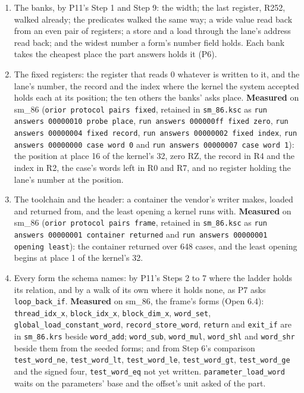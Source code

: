 \begin{enumerate}
\begin{enumerate}
\item The banks, by P11's Step 1 and Step 9: the width; the last register, R252, walked already; the predicates walked the same way; a wide value read back from an even pair of registers; a store and a load through the lane's address read back; and the widest number a form's number field holds. Each bank takes the cheapest place the part answers holds it (P6).
\item The fixed registers: the register that reads 0 whatever is written to it, and the lane's number, the record and the index where the kernel the system accepted holds each at its position; the ten others the banks' asks place. \textbf{Measured} on sm\_\allowbreak{}86 (\texttt{orior protocol pairs fixed}, retained in \texttt{sm\_\allowbreak{}86.\allowbreak{}ksc} as \texttt{run answers 00000010 probe place}, \texttt{run answers 000000ff fixed zero}, \texttt{run answers 00000004 fixed record}, \texttt{run answers 00000002 fixed index}, \texttt{run answers 00000000 case word 0} and \texttt{run answers 00000007 case word 1}): the position at place 16 of the kernel's 32, zero RZ, the record in R4 and the index in R2, the case's words left in R0 and R7, and no register holding the lane's number at the position.
\item The toolchain and the header: a container the vendor's writer makes, loaded and returned from, and the least opening a kernel runs with. \textbf{Measured} on sm\_\allowbreak{}86 (\texttt{orior protocol pairs frame}, retained in \texttt{sm\_\allowbreak{}86.\allowbreak{}ksc} as \texttt{run answers 00000001 container returned} and \texttt{run answers 00000001 opening least}): the container returned over 648 cases, and the least opening begins at place 1 of the kernel's 32.
\item Every form the schema names: by P11's Steps 2 to 7 where the ladder holds its relation, and by a walk of its own where it holds none, as P7 asks \texttt{loop\_\allowbreak{}back\_\allowbreak{}if}. \textbf{Measured} on sm\_\allowbreak{}86, the frame's forms (Open 6.4): \texttt{thread\_\allowbreak{}idx\_\allowbreak{}x}, \texttt{block\_\allowbreak{}idx\_\allowbreak{}x}, \texttt{block\_\allowbreak{}dim\_\allowbreak{}x}, \texttt{word\_\allowbreak{}set}, \texttt{global\_\allowbreak{}load\_\allowbreak{}constant\_\allowbreak{}word}, \texttt{record\_\allowbreak{}store\_\allowbreak{}word}, \texttt{return} and \texttt{exit\_\allowbreak{}if} are in \texttt{sm\_\allowbreak{}86.\allowbreak{}krs} beside \texttt{word\_\allowbreak{}add}; \texttt{word\_\allowbreak{}sub}, \texttt{word\_\allowbreak{}mul}, \texttt{word\_\allowbreak{}shl} and \texttt{word\_\allowbreak{}shr} beside them from the seeded forms; and from Step 6's comparison \texttt{test\_\allowbreak{}word\_\allowbreak{}ne}, \texttt{test\_\allowbreak{}word\_\allowbreak{}lt}, \texttt{test\_\allowbreak{}word\_\allowbreak{}le}, \texttt{test\_\allowbreak{}word\_\allowbreak{}gt}, \texttt{test\_\allowbreak{}word\_\allowbreak{}ge} and the signed four, \texttt{test\_\allowbreak{}word\_\allowbreak{}eq} not yet written. \texttt{parameter\_\allowbreak{}load\_\allowbreak{}word} waits on the parameters' base and the offset's unit asked of the part.

\end{enumerate}
\end{enumerate}
